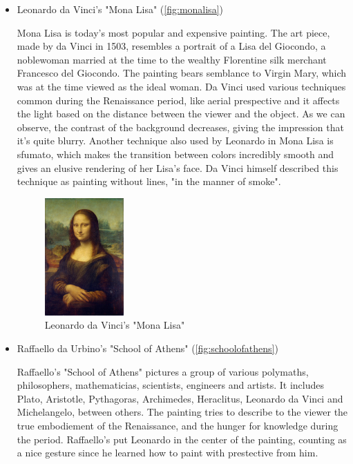\documentclass{report}
\begin{document}
\begin{itemize}
    \item{Leonardo da Vinci's "Mona Lisa" (\autoref{fig:monalisa})}
    
Mona Lisa is today's most popular and expensive painting. The art piece, made by da Vinci in 1503, resembles a portrait of a Lisa del Giocondo, a noblewoman married at the time to the wealthy Florentine silk merchant Francesco del Giocondo. The painting bears semblance to Virgin Mary, which was at the time viewed as the ideal woman. Da Vinci used various techniques common during the Renaissance period, like aerial prespective and it affects the light based on the distance between the viewer and the object. As we can observe, the contrast of the background decreases, giving the impression that it's quite blurry. Another technique also used by Leonardo in Mona Lisa is sfumato, which makes the transition between colors incredibly smooth and gives an elusive rendering of her Lisa's face. Da Vinci himself described this technique as painting without lines, "in the manner of smoke".
	    
\begin{figure}[h]
\center
\includegraphics[height=4.5cm]{img/monalisa}
\caption{Leonardo da Vinci's  "Mona Lisa"}
\label{fig:monalisa}
\end{figure}

	\item{Raffaello da Urbino's "School of Athens" (\autoref{fig:schoolofathens})}

Raffaello's "School of Athens" pictures a group of various polymaths, philosophers, mathematicias, scientists, engineers and artists. It includes Plato, Aristotle, Pythagoras, Archimedes, Heraclitus, Leonardo da Vinci and Michelangelo, between others. The painting tries to describe to the viewer the true embodiement of the Renaissance, and the hunger for knowledge during the period. Raffaello's put Leonardo in the center of the painting, counting as a nice gesture since he learned how to paint with prestective from him. 
		    

\end{itemize}
\end{document}
